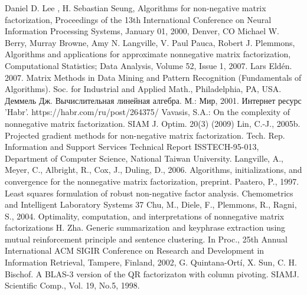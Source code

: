 \newpage
{}

\begin{thebibliography}{9}
   Daniel D. Lee , H. Sebastian Seung, Algorithms for non-negative matrix factorization, Proceedings of the 13th International Conference on Neural Information Processing Systems, January 01, 2000, Denver, CO
   Michael W. Berry, Murray Browne, Amy N. Langville, V. Paul Pauca, Robert J. Plemmons, Algorithms and applications for approximate nonnegative matrix factorization, Computational Statistics; Data Analysis, Volume 52, Issue 1, 2007.
   Lars Eldén. 2007. Matrix Methods in Data Mining and Pattern Recognition (Fundamentals of Algorithms). Soc. for Industrial and Applied Math., Philadelphia, PA, USA.
   Деммель Дж. Вычислительная линейная алгебра. М.: Мир, 2001.
   Интернет ресурс 'Habr'. https://habr.com/ru/post/264375/
   Vavasis, S.A.: On the complexity of nonnegative matrix factorization. SIAM J. Optim. 20(3) (2009)
   Lin, C.-J., 2005b. Projected gradient methods for non-negative matrix factorization. Tech. Rep. Information and Support Services Technical Report ISSTECH-95-013, Department of Computer Science, National Taiwan University.
   Langville, A., Meyer, C., Albright, R., Cox, J., Duling, D., 2006. Algorithms, initializations, and convergence for the nonnegative matrix factorization, preprint.
   Paatero, P., 1997. Least squares formulation of robust non-negative factor analysis. Chemometrics and Intelligent Laboratory Systems 37
   Chu, M., Diele, F., Plemmons, R., Ragni, S., 2004. Optimality, computation, and interpretations of nonnegative matrix factorizations
   H. Zha. Generic summarization and keyphrase extraction using mutual reinforcement principle and sentence clustering. In Proc., 25th Annual International ACM SIGIR Conference on Research and Development in Information Retrieval, Tampere, Finland, 2002,
   G. Quintana-Ortí, X. Sun, C. H. Bischof. A BLAS-3 version of the QR factorizaton with column pivoting. SIAMJ. Scientific Comp., Vol. 19, No.5, 1998.
\end{thebibliography}
